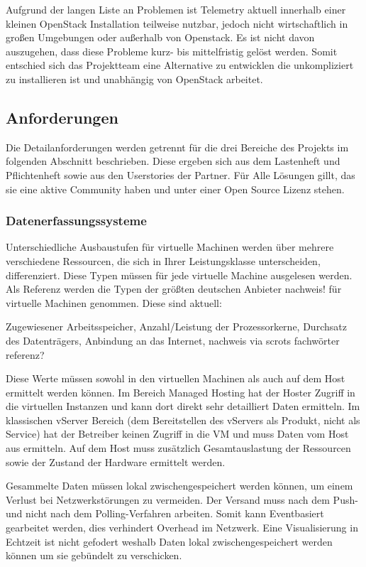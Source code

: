 Aufgrund der langen Liste an Problemen ist Telemetry aktuell innerhalb einer
kleinen OpenStack Installation teilweise nutzbar, jedoch nicht wirtschaftlich
in großen Umgebungen oder außerhalb von Openstack. Es ist nicht davon
auszugehen, dass diese Probleme kurz- bis mittelfristig gelöst werden. Somit
entschied sich das Projektteam eine Alternative zu entwicklen die unkompliziert
zu installieren ist und unabhängig von OpenStack arbeitet.
\tm%

\subsection{Anforderungen}
Die Detailanforderungen werden getrennt für die drei Bereiche des Projekts im
folgenden Abschnitt beschrieben. Diese ergeben sich aus dem Lastenheft und
Pflichtenheft sowie aus den Userstories der Partner. Für Alle Lösungen gillt,
das sie eine aktive Community haben und unter einer Open Source Lizenz stehen.
\tm%

\subsubsection{Datenerfassungssysteme}
\label{subsubsection:datenerfassungssysteme}
Unterschiedliche Ausbaustufen für virtuelle Machinen werden über mehrere
verschiedene Ressourcen, die sich in Ihrer Leistungsklasse unterscheiden,
differenziert. Diese Typen müssen für jede virtuelle Machine ausgelesen werden.
Als Referenz werden die Typen der größten deutschen Anbieter nachweis! für
virtuelle Machinen genommen. Diese sind aktuell:

Zugewiesener Arbeitsspeicher, Anzahl/Leistung der Prozessorkerne, Durchsatz des
Datenträgers, Anbindung an das Internet, nachweis via scrots fachwörter
referenz?

Diese Werte müssen sowohl in den virtuellen Machinen als auch auf dem Host
ermittelt werden können. Im Bereich Managed Hosting hat der Hoster Zugriff in
die virtuellen Instanzen und kann dort direkt sehr detailliert Daten ermitteln.
Im klassischen vServer Bereich (dem Bereitstellen des vServers als Produkt,
nicht als Service) hat der Betreiber keinen Zugriff in die VM und muss Daten
vom Host aus ermitteln. Auf dem Host muss zusätzlich Gesamtauslastung der
Ressourcen sowie der Zustand der Hardware ermittelt werden.

Gesammelte Daten müssen lokal zwischengespeichert werden können, um einem
Verlust bei Netzwerkstörungen zu vermeiden. Der Versand muss nach dem Push- und
nicht nach dem Polling-Verfahren arbeiten. Somit kann Eventbasiert gearbeitet
werden, dies verhindert Overhead im Netzwerk. Eine Visualisierung in Echtzeit
ist nicht gefodert weshalb Daten lokal zwischengespeichert werden können um sie
gebündelt zu verschicken.
\tm%

